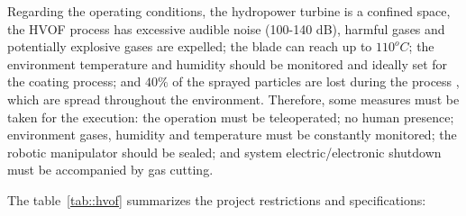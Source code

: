  

Regarding the operating conditions, the hydropower turbine is a confined
space, the HVOF process has excessive audible noise (100-140 dB), harmful gases
and potentially explosive gases are expelled; the blade can reach up to
$110^oC$; the environment temperature and humidity should be monitored and
ideally set for the coating process; and $40\%$ of the sprayed particles are
lost during the process \citep{wu2006rebound}, which are spread throughout
the environment. Therefore, some measures must be taken for the execution: the
operation must be teleoperated; no human presence; environment gases, humidity
and temperature must be constantly monitored; the robotic manipulator should be
sealed; %
and system electric/electronic shutdown must be accompanied by gas cutting.



The table~\ref{tab::hvof} summarizes the project restrictions and specifications:

